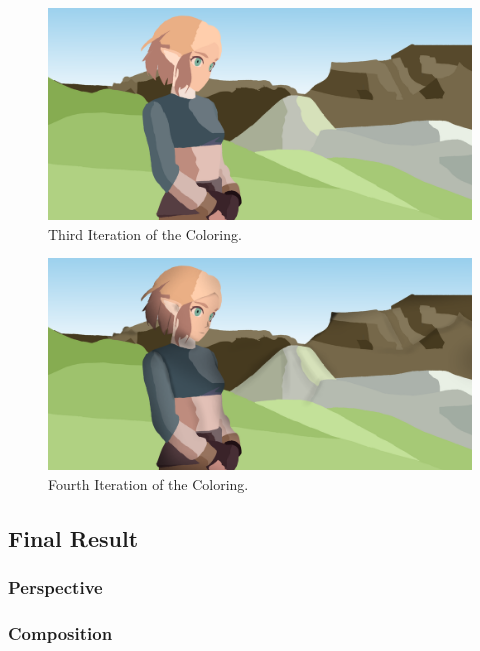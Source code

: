 \documentclass{cup-pan}
\begin{document}
        \begin{figure}[H]
            \includegraphics[width=\textwidth]{Fanart3/3_Color/III_Color.png}
            \caption{Third Iteration of the Coloring.}
        \end{figure}

        \begin{figure}[H]
            \includegraphics[width=\textwidth]{Fanart3/3_Color/IIII_Color.png}
            \caption{Fourth Iteration of the Coloring.}
        \end{figure}

    \subsection{Final Result}

        \subsubsection{Perspective}
            
        \subsubsection{Composition}
            
\end{document}

